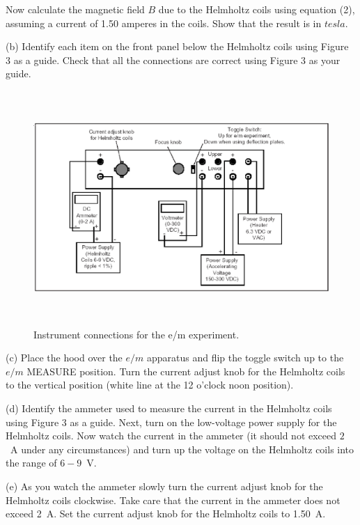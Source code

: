 Now calculate the magnetic field $B$ due to the Helmholtz coils using equation 
(2), assuming a current of 1.50 amperes in the coils. Show that the result is 
in $tesla$.
\vspace{30mm}

(b) Identify each item on the front panel below
the Helmholtz coils using Figure 3 as a guide.
Check that all the connections are correct using Figure 3 as your guide. 
\begin{figure}[hbt]
\begin{center}

\includegraphics[height=3.5in]{eoverm/apparatus2.eps}

\caption{Instrument connections for the e/m experiment.}

\end{center}
\end{figure}

(c) Place the hood over the $e/m$ apparatus and flip the 
toggle switch up to the $e/m$ MEASURE
position.
Turn the current adjust knob for the Helmholtz coils to the vertical position (white line
at the 12 o'clock noon position).

(d) Identify the ammeter used to measure the current in the Helmholtz
coils using Figure 3 as a guide. 
Next, turn on the low-voltage power supply for the Helmholtz coils.
Now watch the current in the ammeter (it should not exceed $2$~A under
any circumstances) and
turn up the voltage on the Helmholtz coils into the range of $6-9$~V.

(e) As you watch the ammeter slowly turn the current adjust knob for the 
Helmholtz coils clockwise. Take care that
the current in the ammeter does not exceed 2~A.
Set the current adjust knob for the Helmholtz coils to 1.50~A.

